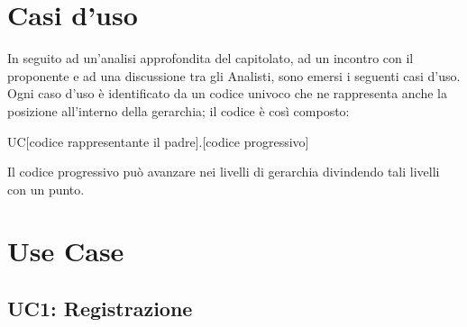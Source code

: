 \section{Casi d'uso}
In seguito ad un'analisi approfondita del capitolato, ad un incontro con il proponente \Zucchetti e ad una discussione tra gli Analisti, sono emersi i seguenti casi d'uso.\\
Ogni caso d'uso è identificato da un codice univoco che ne rappresenta anche la posizione all'interno della gerarchia; il codice è così composto:
\begin{center}
UC[codice rappresentante il padre].[codice progressivo]
\end{center}
Il codice progressivo può avanzare nei livelli di gerarchia divindendo tali livelli con un punto.

\newpage





\section{Use Case}
\subsection{ UC1: Registrazione}

